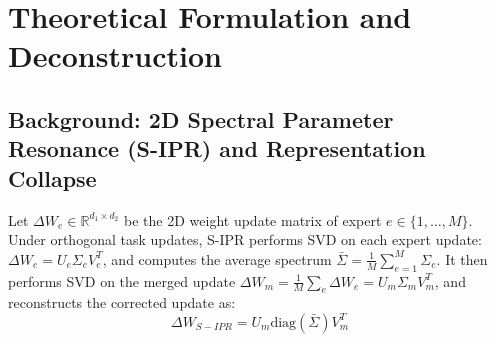 \documentclass{article}
\theoremstyle{plain}
\theoremstyle{definition}
\theoremstyle{remark}
\begin{document}
\section{Theoretical Formulation and Deconstruction}

\subsection{Background: 2D Spectral Parameter Resonance (S-IPR) and Representation Collapse}
Let $\Delta W_{e} \in \mathbb{R}^{d_1 \times d_2}$ be the 2D weight update matrix of expert $e \in \{1, \dots, M\}$. Under orthogonal task updates, S-IPR performs SVD on each expert update: $\Delta W_e = U_e \Sigma_e V_e^T$, and computes the average spectrum $\bar{\Sigma} = \frac{1}{M}\sum_{e=1}^M \Sigma_e$. It then performs SVD on the merged update $\Delta W_{m} = \frac{1}{M}\sum_e \Delta W_e = U_m \Sigma_m V_m^T$, and reconstructs the corrected update as:
\begin{equation}
    \Delta W_{S-IPR} = U_m \text{diag}(\bar{\Sigma}) V_m^T
\end{equation}
\end{document}
